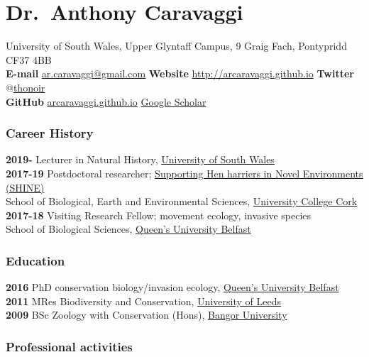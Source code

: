 \documentclass[]{article}
\title{}
\author{}
\date{}
\begin{document}
\section{Dr.~Anthony Caravaggi}\label{dr.anthony-caravaggi}

University of South Wales, Upper Glyntaff Campus, 9 Graig Fach,
Pontypridd CF37 4BB\\
\textbf{E-mail} \url{ar.caravaggi@gmail.com} \textbar{} \textbf{Website}
\url{http://arcaravaggi.github.io} \textbar{} \textbf{Twitter}
@\href{https://twitter.com/thonoir}{thonoir}\\
\textbf{GitHub}
\href{https://arcaravaggi.github.io}{arcaravaggi.github.io} \textbar{}
\href{https://scholar.google.co.uk/citations?user=PXf81KIAAAAJ\&hl=en}{Google
Scholar}

\subsubsection{Career History}\label{career-history}

\textbf{2019-} Lecturer in Natural History,
\href{http://www.southwales.ac.uk}{University of South Wales}\\
\textbf{2017-19} Postdoctoral researcher;
\href{https://www.ucc.ie/en/forestecology/research/shine/}{Supporting
Hen harriers in Novel Environments (SHINE)}\\
School of Biological, Earth and Environmental Sciences,
\href{http://www.ucc.ie/en/}{University College Cork}\\
\textbf{2017-18} Visiting Research Fellow; movement ecology, invasive
species\\
School of Biological Sciences,
\href{http://www.qub.ac.uk/schools/SchoolofBiologicalSciences/}{Queen's
University Belfast}

\subsubsection{Education}\label{education}

\textbf{2016} PhD conservation biology/invasion ecology,
\href{http://www.qub.ac.uk/schools/SchoolofBiologicalSciences/}{Queen's
University Belfast}\\
\textbf{2011} MRes Biodiversity and Conservation,
\href{https://www.leeds.ac.uk/}{University of Leeds}\\
\textbf{2009} BSc Zoology with Conservation (Hons),
\href{https://www.bangor.ac.uk/}{Bangor University}

\subsubsection{Professional activities}\label{professional-activities}
\end{document}
